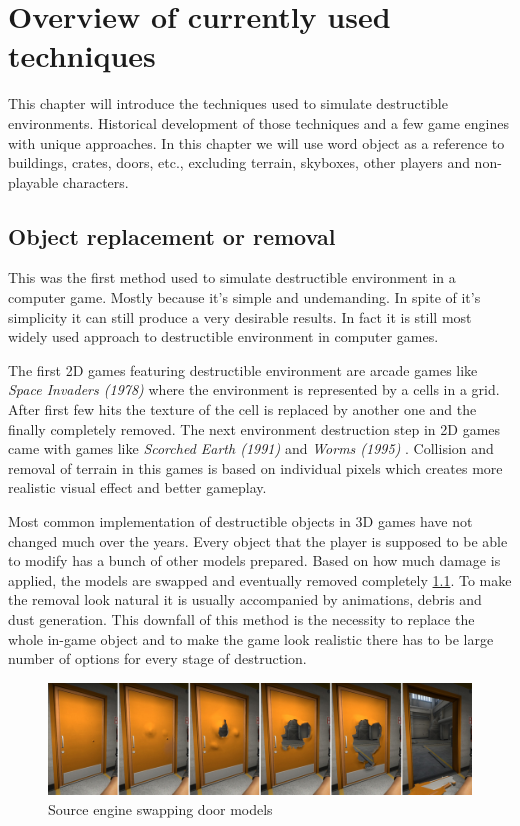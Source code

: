 \chapter{Overview of currently used techniques}
This chapter will introduce the techniques used to simulate destructible environments. Historical development of those techniques and a few game engines with unique approaches. In this chapter we will use word object as a reference to buildings, crates, doors, etc., excluding terrain, skyboxes, other players and non-playable characters.

\section{Object replacement or removal}
This was the first method used to simulate destructible environment in a computer game. Mostly because it's simple and undemanding. In spite of it's simplicity it can still produce a very desirable results. In fact it is still most widely used approach to destructible environment in computer games.

The first 2D games featuring destructible environment are arcade games like \emph{Space Invaders (1978)} \cite{invaders} where the environment is represented by a cells in a grid. After first few hits the texture of the cell is replaced by another one and the finally completely removed. The next environment destruction step in 2D games came with games like \emph{Scorched Earth (1991)} \cite{scorched} and \emph{Worms (1995)} \cite{worms}. Collision and removal of terrain in this games is based on individual pixels which creates more realistic visual effect and better gameplay.

Most common implementation of destructible objects in 3D games have not changed much over the years. Every object that the player is supposed to be able to modify has a bunch of other models prepared. Based on how much damage is applied, the models are swapped and eventually removed completely \ref{doors}. To make the removal look natural it is usually accompanied by animations, debris and dust generation. This downfall of this method is the necessity to replace the whole in-game object and to make the game look realistic there has to be large number of options for every stage of destruction.

\begin{figure}[!h]
\label{doors}
\includegraphics[width=\textwidth]{img/doors}
\caption{Source engine swapping door models}
\end{figure}


